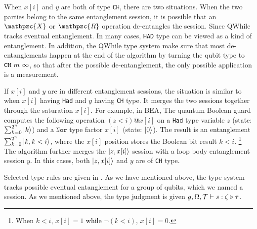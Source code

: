 When $x[i]$ and $y$ are both of type \texttt{CH}, there are two situations.
When the two parties belong to the same entanglement session,
it is possible that an $\mathpzc{X}$ or $\mathpzc{R}$ operation de-entangles the session.
Since QWhile tracks eventual entanglement.
In many cases, \texttt{HAD} type can be viewed as a kind of entanglement.
In addition, the QWhile type system make sure that most de-entanglements happen
at the end of the algorithm by turning the qubit type to $\texttt{CH}~{m}~{\infty}$,
so that after the possible de-entanglement, the only possible application is a measurement.

If $x[i]$ and $y$ are in different entanglement sessions,
the situation is similar to when $x[i]$ having \texttt{Had} and $y$ having \texttt{CH} type.
It merges the two sessions together through the saturation $x[i]$.
For example, in BEA, The quantum Boolean guard computes the following operation $(z < i) @ x[i]$
on a \texttt{Had} type variable $z$ (state: $\sum_{k=0}^{2^n}\left\vert{k}\right\rangle$)
and a $\texttt{Nor}$ type factor $x[i]$ (state: $\left\vert{0}\right\rangle$).
The result is an entanglement $\sum_{k=0}^{2^n}\left\vert{k,k < i}\right\rangle$,
where the $x[i]$ position stores the Boolean bit result $k < i$. \footnote{When $k<i$, $x[i]=1$ while $\neg (k<i)$, $x[i]=0$.}
The algorithm further merges the $\left\vert{z,x[i]}\right\rangle$ session with a loop body entanglement session $y$. 
In this cases, both $\left\vert{z,x[i]}\right\rangle$ and $y$ are of \texttt{CH} type. 




Selected type rules are given in .
As we have mentioned above, the type system tracks 
possible eventual entanglement for a group of qubits, which we named a session.
As we mentioned above, the type judgment is given $g,\Omega,\mathcal{T}\vdash s : \zeta\triangleright \tau$.

